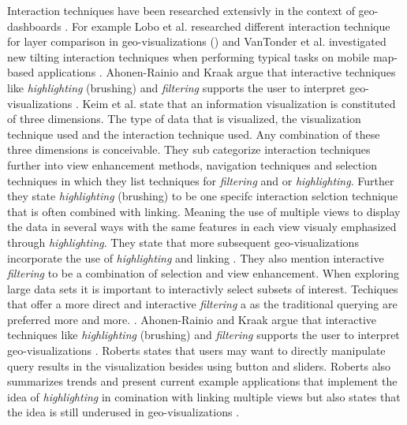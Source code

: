 Interaction techniques have been researched extensivly in the context of geo-dashboards \citep*{Keim.2005,Lobo.2015,vanTonder.2011}.
For example Lobo et al. researched different interaction technique for layer comparison in geo-visualizations (\citep*{Lobo.2015}) and
VanTonder et al. investigated new tilting interaction techniques when performing typical tasks on mobile map-based applications \citep*{vanTonder.2011}.
Ahonen-Rainio and Kraak argue that interactive techniques like \textit{highlighting} (brushing) and \textit{filtering} supports the user
to interpret geo-visualizations \citep*{AhonenRainio.2005}.
Keim et al. state that an information visualization is constituted of three dimensions. The type of data that is visualized, the visualization technique used
and the interaction technique used. Any combination of these three dimensions is conceivable. They sub categorize interaction techniques further into
view enhancement methods, navigation techniques and selection techniques in which they list techniques for \textit{filtering} and or \textit{highlighting}. Further they state
\textit{highlighting} (brushing) to be one specifc interaction selction technique that is often combined with linking. Meaning the use of multiple views to display the
data in several ways with the same features in each view visualy emphasized through \textit{highlighting}. They state that more subsequent geo-visualizations incorporate the
use of \textit{highlighting} and linking \citep*{Keim.2005}. They also mention interactive \textit{filtering} to be a combination of selection and view enhancement. When exploring large
data sets it is important to interactivly select subsets of interest. Techiques that offer a more direct and interactive \textit{filtering} a as the traditional querying are
preferred more and more. \citep*{Keim.2005}. Ahonen-Rainio and Kraak argue that interactive techniques like \textit{highlighting} (brushing) and \textit{filtering} supports the user
to interpret geo-visualizations \citep*{AhonenRainio.2005}. Roberts states that users may want to directly manipulate query results in the visualization besides using button
and sliders. Roberts also summarizes trends and present current example applications that implement the idea of \textit{highlighting}
in comination with linking multiple views but also states that the idea is still underused in geo-visualizations \citep*{Roberts.2005}.


